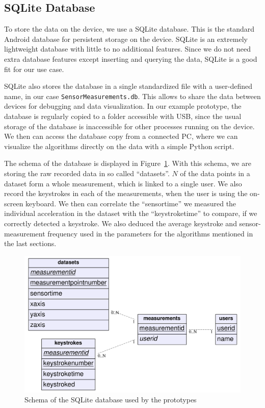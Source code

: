 \subsection{SQLite Database}
To store the data on the device, we use a SQLite database. This is the standard Android database for persistent storage on the device. SQLite is an extremely lightweight database with little to no additional features. Since we do not need extra database features except inserting and querying the data, SQLite is a good fit for our use case.

SQLite also stores the database in a single standardized file with a user-defined name, in our case \lstinline$SensorMeasurements.db$. This allows to share the data between devices for debugging and data visualization. In our example prototype, the database is regularly copied to a folder accessible with USB, since the usual storage of the database is inaccessible for other processes running on the device. We then can access the database copy from a connected PC, where we can visualize the algorithms directly on the data with a simple Python script.

The schema of the database is displayed in Figure~\ref{fig:dbschema}. With this schema, we are  storing the raw recorded data in so called ``datasets''. $N$ of the data points in a dataset form a whole measurement, which is linked to a single user. We also record the keystrokes in each of the measurements, when the user is using the on-screen keyboard. We then can correlate the ``sensortime'' we measured the individual acceleration in the dataset with the ``keystroketime'' to compare, if we correctly detected a keystroke. We also deduced the average keystroke and sensor-measurement frequency used in the parameters for the algorithms mentioned in the last sections.
\begin{figure}
    \centering
    \includegraphics[width=\textwidth]{figures/databaseschema.png}
    \caption{Schema of the SQLite database used by the prototypes}
    \label{fig:dbschema}
\end{figure}

